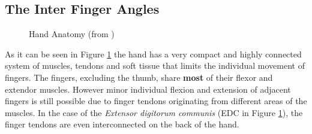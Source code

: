 \subsection{The Inter Finger Angles}

\begin{figure}
\centering
{}
\caption{Hand Anatomy (from \cite{laviola1999survey})}
\label{fig:handAnatomyTotal}
\end{figure}

As it can be seen in Figure \ref{fig:handAnatomyTotal} the hand has a very compact and highly connected system of muscles, tendons and soft tissue that limits the individual movement of fingers.
The fingers, excluding the thumb, share \textbf{most} of their flexor and extendor muscles. However minor individual flexion and extension of adjacent fingers is still possible due to finger tendons originating from different areas of the muscles. In the case of the \textit{Extensor digitorum communis} (EDC in Figure \ref{fig:handAnatomyTotal}), the finger tendons are even interconnected on the back of the hand.

